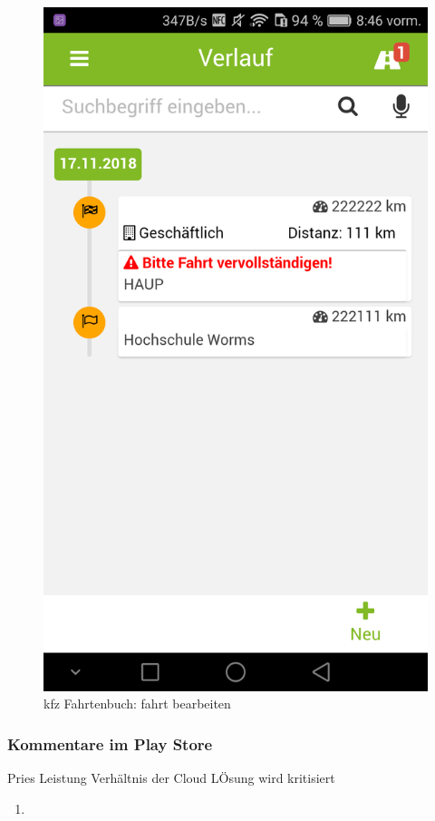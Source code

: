 \begin{figure}[H]
\begin{minipage}[b]{.4\linewidth}
        \includegraphics[scale=0.14]{img/kfz4}
        \caption{\label{img:img/kfz4}kfz Fahrtenbuch: fahrt bearbeiten}
    \end{minipage}
\end{figure}

\subsubsection{Kommentare im Play Store}
Pries Leistung Verhältnis der Cloud LÖsung wird kritisiert
\begin{enumerate}
    \item
\end{enumerate}

